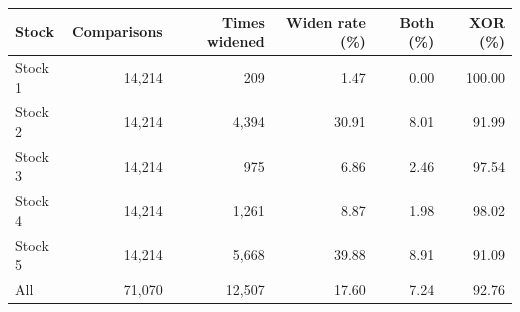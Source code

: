 \begin{tabular}{lrrrrr}
\toprule
Stock & Comparisons & Times widened & Widen rate (\%) & Both (\%) & XOR (\%) \\
\midrule
Stock 1 & 14{,}214 & 209 & 1.47 & 0.00 & 100.00 \\
Stock 2 & 14{,}214 & 4{,}394 & 30.91 & 8.01 & 91.99 \\
Stock 3 & 14{,}214 & 975 & 6.86 & 2.46 & 97.54 \\
Stock 4 & 14{,}214 & 1{,}261 & 8.87 & 1.98 & 98.02 \\
Stock 5 & 14{,}214 & 5{,}668 & 39.88 & 8.91 & 91.09 \\
All & 71{,}070 & 12{,}507 & 17.60 & 7.24 & 92.76 \\
\bottomrule
\end{tabular}
